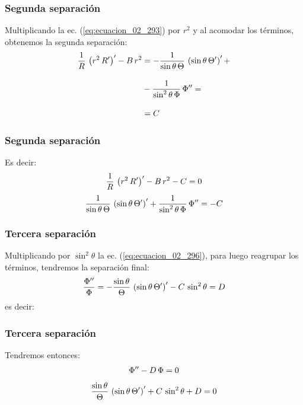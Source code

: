 \documentclass[12pt]{beamer}
\begin{document}
\begin{frame}
\frametitle{Segunda separación}
Multiplicando la ec. (\ref{eq:ecuacion_02_293}) por $r^{2}$ y al acomodar los términos, obtenemos la segunda separación:
\begin{align}
\begin{aligned}
\dfrac{1}{R} \, \left( r^{2} \, {R}^{\prime} \right)^{\prime} - B \, r^{2} &=  - \dfrac{1}{\sin \theta \, \Theta} \, \left( \sin \theta \, {\Theta}^{\prime} \right)^{\prime} + \\[1em]
&- \dfrac{1}{\sin^{2} \theta \, \Phi} \, {\Phi}^{\prime \prime} = \\[1em]
&= C
\end{aligned}
\label{eq:ecuacion_02_294}
\end{align}
\end{frame}
\begin{frame}
\frametitle{Segunda separación}
Es decir:
\begin{align}
\dfrac{1}{R} \, \left( r^{2} \, {R}^{\prime} \right)^{\prime} - B \, r^{2} - C = 0
\label{eq:ecuacion_02_295}
\end{align}
\begin{align}
\dfrac{1}{\sin \theta \, \Theta} \, \left( \sin \theta \, {\Theta}^{\prime} \right)^{\prime} + \dfrac{1}{\sin^{2} \theta \, \Phi} \, {\Phi}^{\prime \prime} = - C
\label{eq:ecuacion_02_296}
\end{align}
\end{frame}
\begin{frame}
\frametitle{Tercera separación}
Multiplicando por $\sin^{2} \theta$ la ec. (\ref{eq:ecuacion_02_296}), para luego reagrupar los términos, tendremos la separación final:
\begin{align}
\dfrac{{\Phi}^{\prime \prime}}{\Phi} = - \dfrac{\sin \theta}{\Theta} \, \left( \sin \theta \, {\Theta}^{\prime} \right)^{\prime} - C \, \sin^{2} \theta = D
\label{eq:ecuacion_02_297}
\end{align}
es decir:
\end{frame}
\begin{frame}
\frametitle{Tercera separación}
Tendremos entonces:
\begin{align}
{\Phi}^{\prime \prime} - D \, \Phi = 0
\label{eq:ecuacion_02_298}
\end{align}
\begin{align}
\dfrac{\sin \theta}{\Theta} \, \left( \sin \theta \, {\Theta}^{\prime} \right)^{\prime} + C \, \sin^{2} \theta + D = 0
\label{eq:ecuacion_02_299}
\end{align}
\end{frame}
\end{document}
